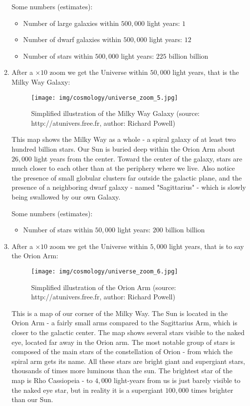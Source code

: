 \begin{enumerate}
		Some numbers (estimates):
		\begin{itemize}
			\item Number of large galaxies within $500,000$ light years: $1$
			\item Number of dwarf galaxies within $500,000$ light years: $12$
			\item Number of stars within $500,000$ light years: $225$ billion billion
		\end{itemize}
		
		\item After a $\times 10$ zoom we get the Universe within $50,000$ light years, that is the Milky Way Galaxy:
		\begin{figure}[H]
			\centering
			\texttt{[image: img/cosmology/universe\_zoom\_5.jpg]}
			\caption[Simplified illustration of the Milky Way Galaxy]{Simplified illustration of the Milky Way Galaxy (source: http://atunivers.free.fr, author: Richard Powell)}
		\end{figure}
		This map shows the Milky Way as a whole - a spiral galaxy of at least two hundred billion stars. Our Sun is buried deep within the Orion Arm about $26,000$ light years from the center. Toward the center of the galaxy, stars are much closer to each other than at the periphery where we live. Also notice the presence of small globular clusters far outside the galactic plane, and the presence of a neighboring dwarf galaxy - named "Sagittarius" - which is slowly being swallowed by our own Galaxy.
		
		Some numbers (estimates):
		\begin{itemize}
			\item Number of stars within $50,000$ light years: $200$ billion billion
		\end{itemize}
		
		\item After a $\times 10$ zoom we get the Universe within $5,000$ light years, that is to say the Orion Arm:
		\begin{figure}[H]
			\centering
			\texttt{[image: img/cosmology/universe\_zoom\_6.jpg]}
			\caption[Simplified illustration of the Orion Arm]{Simplified illustration of the Orion Arm (source: http://atunivers.free.fr, author: Richard Powell)}
		\end{figure}
		This is a map of our corner of the Milky Way. The Sun is located in the Orion Arm - a fairly small arms compared to the Sagittarius Arm, which is closer to the galactic center. The map shows several stars visible to the naked eye, located far away in the Orion arm. The most notable group of stars is composed of the main stars of the constellation of Orion - from which the spiral arm gets its name. All these stars are bright giant and supergiant stars, thousands of times more luminous than the sun. The brightest star of the map is Rho Cassiopeia - to $4,000$ light-years from us is just barely visible to the naked eye star, but in reality it is a supergiant $100,000$ times brighter than our Sun.
		

\end{enumerate}
